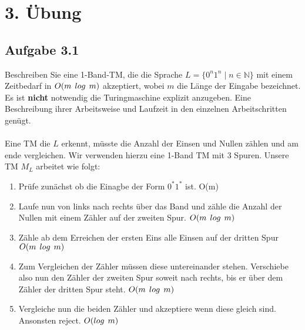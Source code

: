 \section*{3. Übung}
\subsection*{Aufgabe 3.1}
Beschreiben Sie eine 1-Band-TM, die die Sprache $L = \{0^n1^n \mid n \in \mathbb{N}\}$ mit einem Zeitbedarf in $O(m \hspace{0,15cm} log \hspace{0,15cm} m)$ akzeptiert, wobei $m$ die Länge der Eingabe bezeichnet.\\
Es ist \textbf{nicht} notwendig die Turingmaschine explizit anzugeben. Eine Beschreibung ihrer Arbeitsweise und Laufzeit in den einzelnen Arbeitschritten genügt.\\
\\

Eine TM die $L$ erkennt, müsste die Anzahl der Einsen und Nullen
zählen und am ende vergleichen. Wir verwenden hierzu eine 1-Band
TM mit 3 Spuren.
Unsere TM $M_{L}$ arbeitet wie folgt:\\

\begin{enumerate}
    \item Prüfe zunächst ob die Einagbe der Form $0^*1^*$ ist. O(m) 
    \item Laufe nun von links nach rechts über das Band und zähle
    die Anzahl der Nullen mit einem Zähler auf der zweiten Spur. $O(m \hspace{0,15cm} log \hspace{0,15cm} m)$
    \item Zähle ab dem Erreichen der ersten Eins alle Einsen auf der dritten Spur $O(m \hspace{0,15cm} log \hspace{0,15cm} m)$
    \item Zum Vergleichen der Zähler müssen diese untereinander stehen. Verschiebe also nun den Zähler der zweiten Spur soweit nach rechts, bis er über dem Zähler der dritten Spur steht. $O(m \hspace{0,15cm} log \hspace{0,15cm} m)$
    \item Vergleiche nun die beiden Zähler und akzeptiere wenn diese gleich sind. Ansonsten reject. $O(log \hspace{0,15cm} m)$
\end{enumerate}

